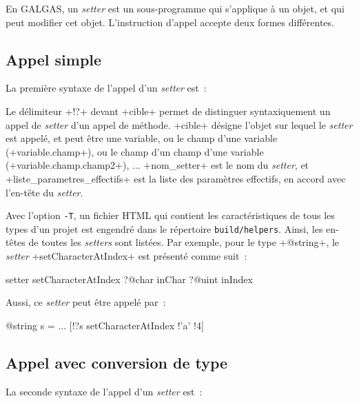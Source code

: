 

En GALGAS, un \emph{setter} est un sous-programme qui s'applique à un objet, et qui peut modifier cet objet. L'instruction d'appel accepte deux formes différentes.

\subsection{Appel simple}

La première syntaxe de l'appel d'un  \emph{setter} est~:
\begin{galgas3}
\end{galgas3}

Le délimiteur \ggst+!?+  devant \ggst+cible+ permet de distinguer syntaxiquement un appel de \emph{setter} d'un appel de méthode. \ggst+cible+ désigne l'objet sur lequel le \emph{setter} est appelé, et peut être une variable, ou le champ d'une variable (\ggst+variable.champ+), ou le champ d'un champ d'une variable (\ggst+variable.champ.champ2+), ... \ggst+nom_setter+ est le nom du \emph{setter}, et \ggst+liste_parametres_effectifs+ est la liste des paramètres effectifs, en accord avec l'en-tête du \emph{setter}.

Avec l'option \texttt{-T}, un fichier HTML qui contient les caractéristiques de tous les types d'un projet est engendré dans le répertoire \texttt{build/helpers}. Ainsi, les en-têtes de toutes les \emph{setters} sont listées. Par exemple, pour le type \ggst+@string+, le \emph{setter} \ggst+setCharacterAtIndex+ est présenté comme suit~:

\begin{galgas3}
setter setCharacterAtIndex
  ?@char inChar
  ?@uint inIndex
\end{galgas3}

Aussi, ce \emph{setter} peut être appelé par~:
\begin{galgas3}
@string s = ...
[!?s setCharacterAtIndex !'a' !4]
\end{galgas3}


\subsection{Appel avec conversion de type}

La seconde syntaxe de l'appel d'un  \emph{setter} est~:

\begin{galgas3}
\end{galgas3}

